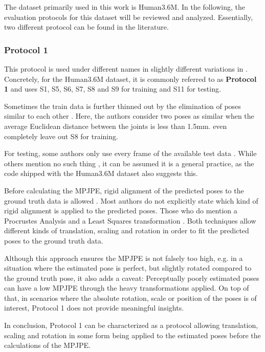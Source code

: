 The dataset primarily used in this work is Human3.6M.
In the following, the evaluation protocols for this dataset will be reviewed and analyzed.
Essentially, two different protocol can be found in the literature.

\subsubsection{Protocol 1}

This protocol is used under different names in slightly different variations in \cite{sun17, drover18, moreno-noguer16, yasin16, kostrikov14, tome17}.
Concretely, for the Human3.6M dataset, it is commonly referred to as \textbf{Protocol 1} and uses S1, S5, S6, S7, S8 and S9 for training and S11 for testing.

Sometimes the train data is further thinned out by the elimination of poses similar to each other \cite{yasin16}.
Here, the authors consider two poses as similar when the average Euclidean distance between the joints is less than 1.5mm.
\citet{drover18} even completely leave out S8 for training.

For testing, some authors only use every  frame of the available test data \cite{sun17, chen17, yasin16, moreno-noguer16, tome17}.
While others mention no such thing \cite{drover18, kostrikov14}, it can be assumed it is a general practice, as the code shipped with the Human3.6M dataset also suggests this.

Before calculating the MPJPE, rigid alignment of the predicted poses to the ground truth data is allowed  \cite{drover18, yasin16, kostrikov14, sun17, tome17, chen17}.
Most authors do not explicitly state which kind of rigid alignment is applied to the predicted poses.
Those who do mention a Procrustes Analysis \cite{sun17, tome17} and a Least Squares transformation \cite{kostrikov14}.
Both techniques allow different kinds of translation, scaling and rotation in order to fit the predicted poses to the ground truth data.

Although this approach ensures the MPJPE is not falsely too high, e.g. in a situation where the estimated pose is perfect, but slightly rotated compared to the ground truth pose, it also adds a caveat:
Perceptually poorly estimated poses can have a low MPJPE through the heavy transformations applied.
On top of that, in scenarios where the absolute rotation, scale or position of the poses is of interest, Protocol 1 does not provide meaningful insights.

In conclusion, Protocol 1 can be characterized as a protocol allowing translation, scaling and rotation in some form being applied to the estimated poses before the calculations of the MPJPE.

